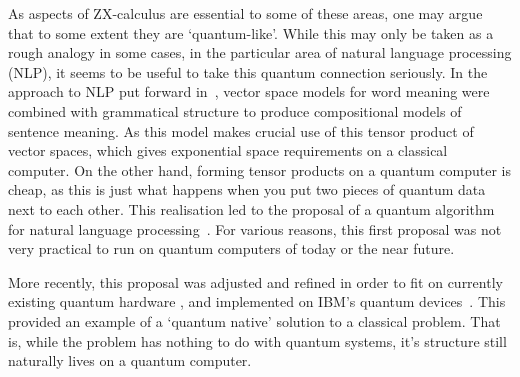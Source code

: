 \documentclass[11pt]{article}
\theoremstyle{definition}
\begin{document}
{As aspects of ZX-calculus are essential to some of these areas, one may argue that to some extent they are `quantum-like'. While this may only be taken as a rough analogy in some cases, in the particular area of natural language processing (NLP), it seems to be useful to take this quantum connection seriously. In the approach to NLP put forward in~\cite{CSC}, vector space models for word meaning were combined with grammatical structure to produce compositional models of sentence meaning. As this model makes crucial use of this tensor product of vector spaces, which gives exponential space requirements on a classical computer. On the other hand, forming tensor products on a quantum computer is cheap, as this is just what happens when you put two pieces of quantum data next to each other. This realisation led to the proposal of a quantum algorithm for natural language processing~\cite{WillC}. For various reasons, this first proposal was not very practical to run on quantum computers of today or the near future.




More recently, this proposal was adjusted and refined in order to fit on currently existing quantum hardware \cite{QPL-QNLP, QNLP-foundations}, and implemented on IBM's quantum devices~\cite{Nature}. This provided an example of a `quantum native' solution to a classical problem. That is, while the problem has nothing to do with quantum systems, it's structure still naturally lives on a quantum computer.


}
\end{document}
